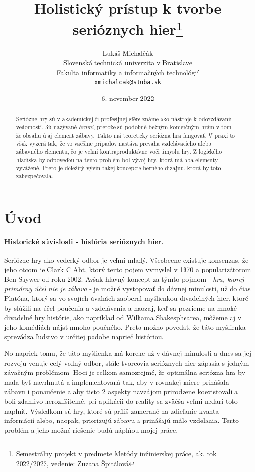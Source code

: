 \documentclass[10pt,twoside,slovak,a4paper]{article}
\title{Holistický prístup k tvorbe serióznych hier\thanks{Semestrálny projekt v predmete Metódy inžinierskej práce, ak. rok 2022/2023, vedenie: Zuzana Špitálová}}
\author{Lukáš Michalčák\\[2pt]
{\small Slovenská technická univerzita v Bratislave}\\
{\small Fakulta informatiky a informačných technológií}\\
{\small \texttt{xmichalcak@stuba.sk}}
}
\date{\small 6. november 2022}
\begin{document}
\maketitle

\begin{abstract}
Seriózne hry sú v akademickej či profesijnej sfére známe ako nástroje k odovzdávaniu vedomostí. Sú nazývané \emph{hrami}, pretože sú podobné bežným komerčným hrám v tom, že obsahujú aj element zábavy. Takto má teoreticky seriózna hra fungovať. V praxi to však vyzerá tak, že vo väčšine prípadov nastáva prevaha vzdelávacieho alebo zábavného elementu, čo je veľmi kontraproduktívne voči úmyslu hry. Z logického hľadiska by odpoveďou na tento problém bol vývoj hry, ktorá má oba elementy vyvážené. Preto je dôležitý vývin takej koncepcie herného dizajnu, ktorá by toto zabezpečovala.
\end{abstract}



\section{Úvod}

\paragraph{Historické súvislosti - história serióznych hier.} Seriózne hry ako vedecký odbor je veľmi mladý. Všeobecne existuje konsenzus, že jeho otcom je Clark C Abt, ktorý tento pojem vymyslel v 1970 a popularizátorom Ben Saywer od roku 2002. \cite{wilkinson2016brief} Avšak hlavný koncept za týmto pojmom - \emph{hra, ktorej primárny účel nie je zábava} \cite{alvarez2011introduction} - je možné vystopovať do dávnej minulosti, už do čias Platóna, ktorý sa vo svojich úvahách zaoberal myšlienkou divadelných hier, ktoré by slúžili na účel poučenia a vzdelávania a naozaj, keď sa pozrieme na mnohé divadelné hry histórie, ako napríklad od Williama Shakesphearea, môžeme aj v jeho komédiách nájsť mnoho poučného. Preto možno povedať, že táto myšlienka sprevádza ľudstvo v určitej podobe naprieč históriou.

\vspace{\baselineskip}

No napriek tomu, že táto myšlienka má korene už v dávnej minulosti a dnes sa jej rozvoju venuje celý vedný odbor, stále tvorcovia serióznych hier zápasia s jedným závažným problémom. Hoci je celkom samozrejmé, že optimálna seriózna hra by mala byť navrhnutá a implementovaná tak, aby v rovnakej miere prinášala zábavu i ponaučenie a aby tieto 2 aspekty navzájom prirodzene koexistovali a boli zdanlivo nerozlíšiteľné, pri aplikácii do reality sa zväčša veľmi nedarí toto naplniť. Výsledkom sú hry, ktoré sú príliš zamerané na zdieľanie kvanta informácií alebo, naopak, priorizujú zábavu a prinášajú málo vzdelania. Tento problém a jeho možné riešenie budú náplňou mojej práce.
\end{document}
